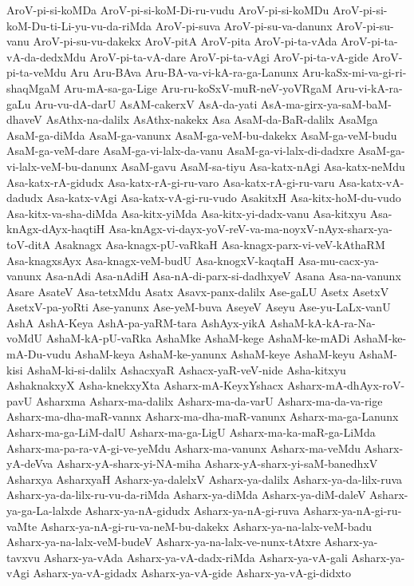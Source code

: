 {AroV-pi-si-koMDa
AroV-pi-si-koM-Di-ru-vudu
AroV-pi-si-koMDu
AroV-pi-si-koM-Du-ti-Li-yu-vu-da-riMda
AroV-pi-suva
AroV-pi-su-va-danunx
AroV-pi-su-vanu
AroV-pi-su-vu-dakekx
AroV-pitA
AroV-pita
AroV-pi-ta-vAda
AroV-pi-ta-vA-da-dedxMdu
AroV-pi-ta-vA-dare
AroV-pi-ta-vAgi
AroV-pi-ta-vA-gide
AroV-pi-ta-veMdu
Aru
Aru-BAva
Aru-BA-va-vi-kA-ra-ga-Lanunx
Aru-kaSx-mi-va-gi-ri-shaqMgaM
Aru-mA-sa-ga-Lige
Aru-ru-koSxV-muR-neV-yoVRgaM
Aru-vi-kA-ra-gaLu
Aru-vu-dA-darU
AsAM-cakerxV
AsA-da-yati
AsA-ma-girx-ya-saM-baM-dhaveV
AsAthx-na-dalilx
AsAthx-nakekx
Asa
AsaM-da-BaR-dalilx
AsaMga
AsaM-ga-diMda
AsaM-ga-vanunx
AsaM-ga-veM-bu-dakekx
AsaM-ga-veM-budu
AsaM-ga-veM-dare
AsaM-ga-vi-lalx-da-vanu
AsaM-ga-vi-lalx-di-dadxre
AsaM-ga-vi-lalx-veM-bu-danunx
AsaM-gavu
AsaM-sa-tiyu
Asa-katx-nAgi
Asa-katx-neMdu
Asa-katx-rA-gidudx
Asa-katx-rA-gi-ru-varo
Asa-katx-rA-gi-ru-varu
Asa-katx-vA-dadudx
Asa-katx-vAgi
Asa-katx-vA-gi-ru-vudo
AsakitxH
Asa-kitx-hoM-du-vudo
Asa-kitx-va-sha-diMda
Asa-kitx-yiMda
Asa-kitx-yi-dadx-vanu
Asa-kitxyu
Asa-knAgx-dAyx-haqtiH
Asa-knAgx-vi-dayx-yoV-reV-va-ma-noyxV-nAyx-sharx-ya-toV-ditA
Asaknagx
Asa-knagx-pU-vaRkaH
Asa-knagx-parx-vi-veV-kAthaRM
Asa-knagxsAyx
Asa-knagx-veM-budU
Asa-knogxV-kaqtaH
Asa-mu-cacx-ya-vanunx
Asa-nAdi
Asa-nAdiH
Asa-nA-di-parx-si-dadhxyeV
Asana
Asa-na-vanunx
Asare
AsateV
Asa-tetxMdu
Asatx
Asavx-panx-dalilx
Ase-gaLU
Asetx
AsetxV
AsetxV-pa-yoRti
Ase-yanunx
Ase-yeM-buva
AseyeV
Aseyu
Ase-yu-LaLx-vanU
AshA
AshA-Keya
AshA-pa-yaRM-tara
AshAyx-yikA
AshaM-kA-kA-ra-Na-voMdU
AshaM-kA-pU-vaRka
AshaMke
AshaM-kege
AshaM-ke-mADi
AshaM-ke-mA-Du-vudu
AshaM-keya
AshaM-ke-yanunx
AshaM-keye
AshaM-keyu
AshaM-kisi
AshaM-ki-si-dalilx
AshacxyaR
Ashacx-yaR-veV-nide
Asha-kitxyu
AshaknakxyX
Asha-knekxyXta
Asharx-mA-KeyxYshacx
Asharx-mA-dhAyx-roV-pavU
Asharxma
Asharx-ma-dalilx
Asharx-ma-da-varU
Asharx-ma-da-va-rige
Asharx-ma-dha-maR-vannx
Asharx-ma-dha-maR-vanunx
Asharx-ma-ga-Lanunx
Asharx-ma-ga-LiM-dalU
Asharx-ma-ga-LigU
Asharx-ma-ka-maR-ga-LiMda
Asharx-ma-pa-ra-vA-gi-ve-yeMdu
Asharx-ma-vanunx
Asharx-ma-veMdu
Asharx-yA-deVva
Asharx-yA-sharx-yi-NA-miha
Asharx-yA-sharx-yi-saM-banedhxV
Asharxya
AsharxyaH
Asharx-ya-dalelxV
Asharx-ya-dalilx
Asharx-ya-da-lilx-ruva
Asharx-ya-da-lilx-ru-vu-da-riMda
Asharx-ya-diMda
Asharx-ya-diM-daleV
Asharx-ya-ga-La-lalxde
Asharx-ya-nA-gidudx
Asharx-ya-nA-gi-ruva
Asharx-ya-nA-gi-ru-vaMte
Asharx-ya-nA-gi-ru-va-neM-bu-dakekx
Asharx-ya-na-lalx-veM-badu
Asharx-ya-na-lalx-veM-budeV
Asharx-ya-na-lalx-ve-nunx-tAtxre
Asharx-ya-tavxvu
Asharx-ya-vAda
Asharx-ya-vA-dadx-riMda
Asharx-ya-vA-gali
Asharx-ya-vAgi
Asharx-ya-vA-gidadx
Asharx-ya-vA-gide
Asharx-ya-vA-gi-didxto
}
